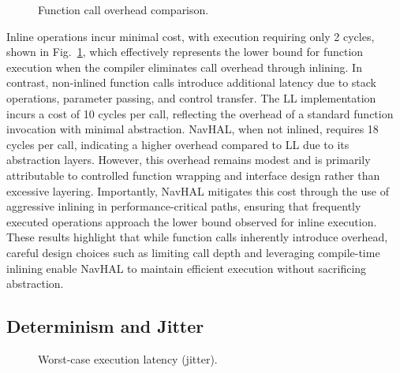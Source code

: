 \begin{figure}[H]
\centering
{}
\caption{Function call overhead comparison.}
\label{fig:call_overhead}
\end{figure}

Inline operations incur minimal cost, with execution requiring only 2 cycles, shown in Fig.~\ref{fig:call_overhead}, which effectively represents the lower bound for function execution when the compiler eliminates call overhead through inlining. In contrast, non-inlined function calls introduce additional latency due to stack operations, parameter passing, and control transfer. The LL implementation incurs a cost of 10 cycles per call, reflecting the overhead of a standard function invocation with minimal abstraction. NavHAL, when not inlined, requires 18 cycles per call, indicating a higher overhead compared to LL due to its abstraction layers. However, this overhead remains modest and is primarily attributable to controlled function wrapping and interface design rather than excessive layering. Importantly, NavHAL mitigates this cost through the use of aggressive inlining in performance-critical paths, ensuring that frequently executed operations approach the lower bound observed for inline execution. These results highlight that while function calls inherently introduce overhead, careful design choices such as limiting call depth and leveraging compile-time inlining enable NavHAL to maintain efficient execution without sacrificing abstraction.

\subsection{Determinism and Jitter}

\begin{figure}[H]
\centering
{}
\caption{Worst-case execution latency (jitter).}
\label{fig:jitter}
\end{figure}

